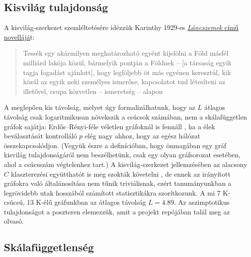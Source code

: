 \documentclass{llncs}
\begin{document}
\subsection{Kisvilág tulajdonság}

A kisvilág-szerkezet szemléltetésére idézzük Karinthy 1929-es
\href{http://www.irodalmijelen.hu/05242013-1547/karinthy-frigyes-lancszemek}{\emph{Láncszemek}
című novellájá}t:

\begin{quote}
  Tessék egy akármilyen meghatározható egyént kijelölni a Föld másfél milliárd
  lakója közül, bármelyik pontján a Földnek – [a társaság egyik tagja fogadást
  ajánlott], hogy legföljebb öt más egyénen keresztül, kik közül az egyik neki
  személyes ismerőse, kapcsolatot tud létesíteni az illetővel, csupa közvetlen
  – ismeretség – alapon
\end{quote}

A meglepően kis távolság, melyet úgy formalizálhatunk, hogy az $L$ átlagos
távolság csak logaritmikusan növekszik a csúcsok számában, nem a skálafüggetlen
gráfok sajátja: Erdős--Rényi-féle véletlen gráfoknál is fennáll
\cite{erdos1960evolution}, ha a élek beválasztását kontrolláló $p$ elég nagy
ahhoz, hogy az egész hálózat összekapcsolódjon. (Vegyük észre a definícióban,
hogy önmagában egy gráf kisvilág tulajdonságáról nem beszélhetünk, csak egy
olyan gráfsorozat esetében, ahol a csúcsszám végtelenhez tart.) 
A kisvilág-szerkezet jellemzésében az alacsony $C$ klaszterezési együtthatót is
meg szokták követelni \cite{watts1998collective}, de ennek az irányított
gráfokra való általánosítása nem tűnik triviálisnak, ezért tanumányunkban  a
legrövidebb utak hosszából számított statisztikákra szorítkozunk.  A mi 7
K-csúcsú, 13 K-élű gráfunkban az átlagos távolság $L=4.89$. Az aszimptotikus
tulajdonságot a poszteren elemezzük, amit a projekt repójában talál meg az
olvasó.

\subsection{Skálafüggetlenség}
\end{document}
